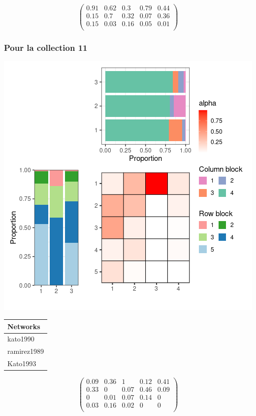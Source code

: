 \normalsize\newline\[\begin{pmatrix} 0.91 &0.62 &0.3 &0.79 &0.44 \\0.15 &0.7 &0.32 &0.07 &0.36 \\0.15 &0.03 &0.16 &0.05 &0.01 \\ \end{pmatrix}\]

\subsubsection{Pour la collection 11 }

\includegraphics{./img/b890876aef1a920f5fdc0fb91d549ad59455c587.png}\newline \tiny

\begin{tabular}{l}
\toprule
Networks\\
\midrule
kato1990\\
ramirez1989\\
Kato1993\\
\bottomrule
\end{tabular}

\normalsize\newline\[\begin{pmatrix} 0.09 &0.36 &1 &0.12 &0.41 \\0.33 &0 &0.07 &0.46 &0.09 \\0 &0.01 &0.07 &0.14 &0 \\0.03 &0.16 &0.02 &0 &0 \\ \end{pmatrix}\]

